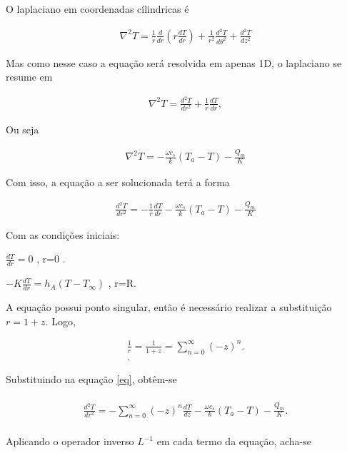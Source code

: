  O laplaciano em coordenadas cílindricas é
 
 \begin{eqnarray}
 \nabla^{2}T = \frac{1}{r}\frac{d}{dr}\left(r\frac{dT}{dr}\right) + \frac{1}{r^{2}}\frac{d^{2}T}{d\theta^{2}} + \frac{d^{2}T}{dz^{2}}
 \end{eqnarray}
 
 Mas como nesse caso a equação será resolvida em apenas 1D, o laplaciano se resume em
 
 \begin{gather*} 
\nabla^{2}T = \frac{d^{2}T}{dr^{2}} + \frac{1}{r}\frac{dT}{dr},
\end{gather*}
 
 Ou seja
 
 \begin{gather*} 
 \nabla^{2}T = - \frac{\omega c_{s}}{k} (T_{a} - T ) - \frac{Q_{m}}{K}
 \end{gather*}

Com isso, a equação a ser solucionada terá a forma


 \begin{eqnarray} 
\frac{d^{2}T}{dr^{2}} = -\frac{1}{r}\frac{dT}{dr}- \frac{\omega c_{s}}{k} (T_{a} - T ) - \frac{Q_{m}}{K}\end{eqnarray}\label{eq}

Com as condições iniciais:


$\frac{dT}{dr} = 0$ , r=0  .

$-K\frac{dT}{dr} = h_{A}(T-T_{\infty})$ , r=R.




A equação possui ponto singular, então é necessário realizar a substituição $r = 1+z$. Logo, 

\begin{gather}
\frac{1}{r} = \frac{1}{1+z} = \sum_{n=0}^{\infty} (-z)^{n}.\nonumber\\ .
\end{gather}

Substituindo na equação \ref{eq}, obtêm-se


 \begin{gather} \nonumber\\
\frac{d^{2}T}{dr^{2}} = -\sum_{n=0}^{\infty} (-z)^{n}\frac{dT}{dz} - \frac{\omega c_{s}}{k} (T_{a} - T ) - \frac{Q_{m}}{K}.\nonumber\\\end{gather}

Aplicando o operador inverso $L^{-1}$ em cada termo da equação, acha-se

